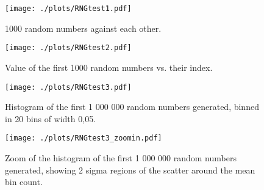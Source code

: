 \documentclass{article}
\begin{document}
\begin{figure}[!h]
\centering
\begin{minipage}[t]{8cm}
	\centering
	\texttt{[image: ./plots/RNGtest1.pdf]}
	\caption{1000 random numbers against each other.}
	\label{fig:RNGtest1}
\end{minipage}%
\quad
\begin{minipage}[t]{8cm}
    \centering
	\texttt{[image: ./plots/RNGtest2.pdf]}
	\caption{Value of the first 1000 random numbers vs. their index.}
	\label{fig:RNGtest2}
\end{minipage}%
\end{figure}

\begin{figure}[!h]
\centering
\begin{minipage}[t]{8cm}
    \centering
	\texttt{[image: ./plots/RNGtest3.pdf]}
	\caption{Histogram of the first 1 000 000 random numbers generated, binned in 20 bins of width 0,05.}
	\label{fig:RNGtest3}
\end{minipage}%
\quad
\begin{minipage}[t]{8cm}
    \centering
	\texttt{[image: ./plots/RNGtest3\_zoomin.pdf]}
	\caption{Zoom of the histogram of the first 1 000 000 random numbers generated, showing 2 sigma regions of the scatter around the mean bin count.}
	\label{fig:RNGtest3_zoom}
\end{minipage}%
\end{figure}
\end{document}
